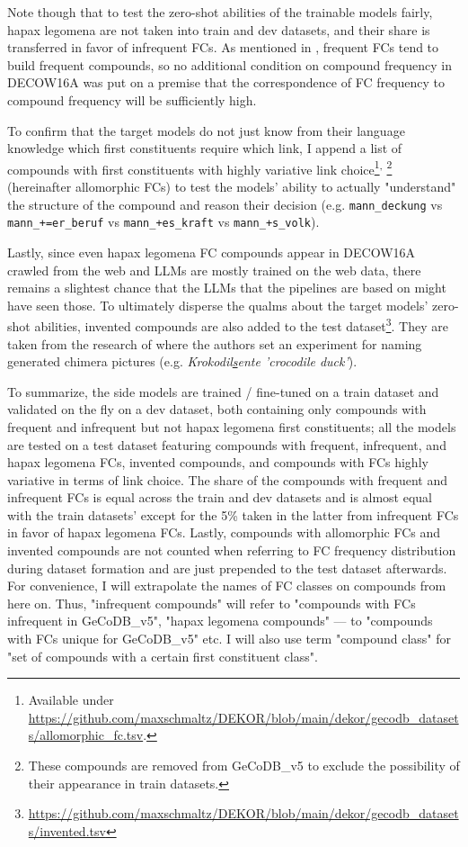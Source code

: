 \documentclass[11pt]{article}
\begin{document}
Note though that to test the zero-shot abilities of the trainable models fairly, hapax legomena are not taken into train and dev datasets, and their share is transferred in favor of infrequent FCs. As mentioned in , frequent FCs tend to build frequent compounds, so no additional condition on compound frequency in DECOW16A was put on a premise that the correspondence of FC frequency to compound frequency will be sufficiently high.

To confirm that the target models do not just know from their language knowledge which first constituents require which link, I append a list of compounds with first constituents with highly variative link choice\footnote{Available under \url{https://github.com/maxschmaltz/DEKOR/blob/main/dekor/gecodb_datasets/allomorphic_fc.tsv}.}\textsuperscript{, }\footnote{These compounds are removed from GeCoDB\_v5 to exclude the possibility of their appearance in train datasets.} (hereinafter allomorphic FCs) to test the models' ability to actually "understand" the structure of the compound and reason their decision (e.g. \texttt{mann\_deckung} vs \texttt{mann\_+=er\_beruf} vs \texttt{mann\_+es\_kraft} vs \texttt{mann\_+s\_volk}).

Lastly, since even hapax legomena FC compounds appear in DECOW16A crawled from the web and LLMs are mostly trained on the web data, there remains a slightest chance that the LLMs that the pipelines are based on might have seen those. To ultimately disperse the qualms about the target models' zero-shot abilities, invented compounds are also added to the test dataset\footnote{\url{https://github.com/maxschmaltz/DEKOR/blob/main/dekor/gecodb_datasets/invented.tsv}}. They are taken from the research of \citet{NeefBorgwaldt+2012+27+56} where the authors set an experiment for naming generated chimera pictures (e.g. \textit{Krokodil\underline{s}ente 'crocodile duck'}).

To summarize, the side models are trained / fine-tuned on a train dataset and validated on the fly on a dev dataset, both containing only compounds with frequent and infrequent but not hapax legomena first constituents; all the models are tested on a test dataset featuring compounds with frequent, infrequent, and hapax legomena FCs, invented compounds, and compounds with FCs highly variative in terms of link choice. The share of the compounds with frequent and infrequent FCs is equal across the train and dev datasets and is almost equal with the train datasets' except for the 5\% taken in the latter from infrequent FCs in favor of hapax legomena FCs. Lastly, compounds with allomorphic FCs and invented compounds are not counted when referring to FC frequency distribution during dataset formation and are just prepended to the test dataset afterwards. For convenience, I will extrapolate the names of FC classes on compounds from here on. Thus, "infrequent compounds" will refer to "compounds with FCs infrequent in GeCoDB\_v5", "hapax legomena compounds" --- to "compounds with FCs unique for GeCoDB\_v5" etc. I will also use term "compound class" for "set of compounds with a certain first constituent class".
\end{document}
